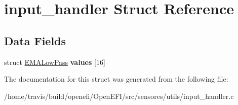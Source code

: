 \hypertarget{structinput__handler}{}\section{input\+\_\+handler Struct Reference}
\label{structinput__handler}
\subsection*{Data Fields}
\begin{DoxyCompactItemize}
\item 
struct \hyperlink{structEMALowPass}{E\+M\+A\+Low\+Pass} {\bfseries values} \mbox{[}16\mbox{]}\hypertarget{structinput__handler_a76a0e5349d8566a86ac7efa33c36c076}{}\label{structinput__handler_a76a0e5349d8566a86ac7efa33c36c076}

\end{DoxyCompactItemize}


The documentation for this struct was generated from the following file\+:\begin{DoxyCompactItemize}
\item 
/home/travis/build/openefi/\+Open\+E\+F\+I/src/sensores/utils/input\+\_\+handler.\+c\end{DoxyCompactItemize}
